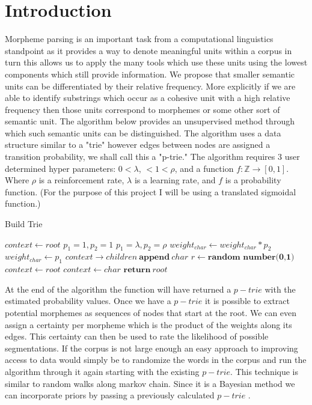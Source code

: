 \documentclass[11pt,a4paper]{article}
\begin{document}
\section{Introduction}
Morpheme parsing is an important task from a computational linguistics 
standpoint as it provides a way to denote meaningful units within a corpus
in turn this allows us to apply the many tools which use these units using the
lowest components which still provide information. We propose that smaller 
semantic units can be differentiated by their relative frequency. More 
explicitly if we are able to identify substrings which occur as a cohesive 
unit with a high relative frequency then those units correspond to morphemes 
or some other sort of semantic unit. The algorithm below provides an 
unsupervised method through which such semantic units can be distinguished.
The algorithm uses a data structure similar to a "trie" however edges between 
nodes are assigned a transition probability, we shall call this a "p-trie." 
The algorithm requires 3 user determined hyper parameters: 
$0 < \lambda $, $< 1 < \rho$, and a function $f:\mathbb{Z}\to[0,1]$. 
Where $\rho$ is a reinforcement rate, 
$\lambda$ is a learning rate, and $f$ is a probability function. (For the 
purpose of this project I will be using a translated sigmoidal function.)
\begin{algorithm}
  \label{alg:algorithm1}
\caption{Build Trie}
\begin{algorithmic}
\STATE $context \leftarrow root$
\STATE $p_1 = 1,p_2=1$
\ELSE
\STATE $p_1 = \lambda, p_2 = \rho$
\ENDIF
{}
\STATE $weight_{char} \leftarrow weight_{char} * p_2$
\ELSE
\STATE $weight_{char} \leftarrow p_1$
\STATE $context\to children\ \textbf{append}\ char$
\ENDIF
\STATE $r \leftarrow \textbf{random number(0,1)}$
\STATE $context \leftarrow root$
\ELSE
\STATE $context \leftarrow char$
\ENDIF
\ENDFOR
\STATE $\textbf{return}\ root$
\end{algorithmic}
\end{algorithm}
At the end of the algorithm the function will have returned a $p-trie$ with
the estimated probability values. Once we have a $p-trie$ it is possible to
extract potential morphemes as sequences of nodes that start at the root. We
can even assign a certainty per morpheme which is the product of the weights 
along its edges. This certainty can then be used to rate the likelihood of 
possible segmentations. If the corpus is not large enough an easy approach to 
improving access to data would simply be to randomize the words in the corpus
and run the algorithm through it again starting with the existing $p-trie$. 
This technique is similar to random walks along markov chain. Since it is a 
Bayesian method we can incorporate priors by passing a previously calculated
$p-trie$ \cite{Bayesian}.
\end{document}
